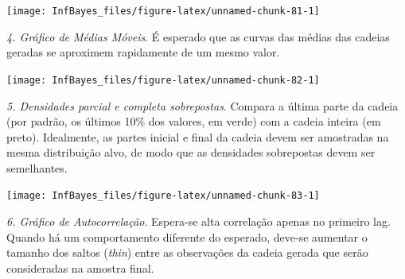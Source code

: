 \documentclass[
]{book}
\newenvironment{Shaded}{\begin{snugshade}}{\end{snugshade}}
\newcommand{\KeywordTok}[1]{\textcolor[rgb]{0.13,0.29,0.53}{\textbf{#1}}}
\newcommand{\NormalTok}[1]{#1}
\newcommand{\OperatorTok}[1]{\textcolor[rgb]{0.81,0.36,0.00}{\textbf{#1}}}
\newcommand{\StringTok}[1]{\textcolor[rgb]{0.31,0.60,0.02}{#1}}
\begin{document}
\begin{center}\texttt{[image: InfBayes\_files/figure-latex/unnamed-chunk-81-1]} \end{center}

\emph{4. Gráfico de Médias Móveis}. É esperado que as curvas das médias das cadeias geradas se aproximem rapidamente de um mesmo valor.

\begin{Shaded}
\end{Shaded}

\begin{center}\texttt{[image: InfBayes\_files/figure-latex/unnamed-chunk-82-1]} \end{center}

\emph{5. Densidades parcial e completa sobrepostas}. Compara a última parte da cadeia (por padrão, os últimos 10\% dos valores, em verde) com a cadeia inteira (em preto). Idealmente, as partes inicial e final da cadeia devem ser amostradas na mesma distribuição alvo, de modo que as densidades sobrepostas devem ser semelhantes.

\begin{Shaded}
\end{Shaded}

\begin{center}\texttt{[image: InfBayes\_files/figure-latex/unnamed-chunk-83-1]} \end{center}

\emph{6. Gráfico de Autocorrelação}. Espera-se alta correlação apenas no primeiro lag. Quando há um comportamento diferente do esperado, deve-se aumentar o tamanho dos saltos (\emph{thin}) entre as observações da cadeia gerada que serão consideradas na amostra final.

\begin{Shaded}
\end{Shaded}
\end{document}
